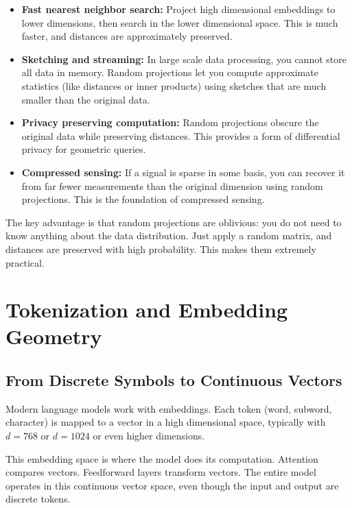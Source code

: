 \begin{itemize}
\item \textbf{Fast nearest neighbor search:} Project high dimensional embeddings to lower dimensions, then search in the lower dimensional space. This is much faster, and distances are approximately preserved.

\item \textbf{Sketching and streaming:} In large scale data processing, you cannot store all data in memory. Random projections let you compute approximate statistics (like distances or inner products) using sketches that are much smaller than the original data.

\item \textbf{Privacy preserving computation:} Random projections obscure the original data while preserving distances. This provides a form of differential privacy for geometric queries.

\item \textbf{Compressed sensing:} If a signal is sparse in some basis, you can recover it from far fewer measurements than the original dimension using random projections. This is the foundation of compressed sensing.
\end{itemize}

\vspace{1em}

The key advantage is that random projections are oblivious: you do not need to know anything about the data distribution. Just apply a random matrix, and distances are preserved with high probability. This makes them extremely practical.

\vspace{2em}

\section{Tokenization and Embedding Geometry}

\subsection{From Discrete Symbols to Continuous Vectors}

Modern language models work with embeddings. Each token (word, subword, character) is mapped to a vector in a high dimensional space, typically with $d = 768$ or $d = 1024$ or even higher dimensions.

This embedding space is where the model does its computation. Attention compares vectors. Feedforward layers transform vectors. The entire model operates in this continuous vector space, even though the input and output are discrete tokens.

